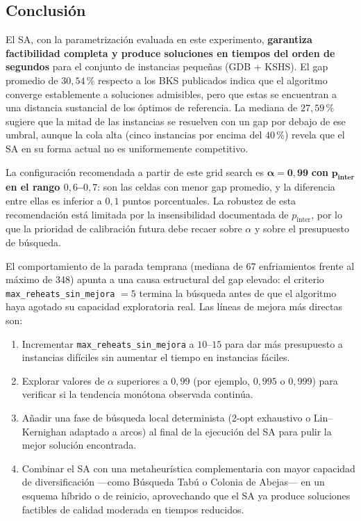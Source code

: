 \subsection{Conclusión}
\label{subsec:conclusion_final}

El SA, con la parametrización evaluada en este experimento, \textbf{garantiza
factibilidad completa y produce soluciones en tiempos del orden de segundos} para el
conjunto de instancias pequeñas (GDB + KSHS). El gap promedio de \(30{,}54\,\%\)
respecto a los BKS publicados indica que el algoritmo converge establemente a
soluciones admisibles, pero que estas se encuentran a una distancia sustancial de los
óptimos de referencia. La mediana de \(27{,}59\,\%\) sugiere que la mitad de las
instancias se resuelven con un gap por debajo de ese umbral, aunque la cola alta (cinco
instancias por encima del \(40\,\%\)) revela que el SA en su forma actual no es
uniformemente competitivo.

La configuración recomendada a partir de este grid search es \(\boldsymbol{\alpha =
0{,}99}\) \textbf{con} \(\boldsymbol{p_{\text{inter}}}\) \textbf{en el rango
\(0{,}6\)--\(0{,}7\)}: son las celdas con menor gap promedio, y la diferencia entre
ellas es inferior a \(0{,}1\) puntos porcentuales. La robustez de esta recomendación
está limitada por la insensibilidad documentada de \(p_{\text{inter}}\), por lo que la
prioridad de calibración futura debe recaer sobre \(\alpha\) y sobre el presupuesto de
búsqueda.

El comportamiento de la parada temprana (mediana de 67 enfriamientos frente al máximo
de 348) apunta a una causa estructural del gap elevado: el criterio
\texttt{max\_reheats\_sin\_mejora} \(= 5\) termina la búsqueda antes de que el
algoritmo haya agotado su capacidad exploratoria real. Las líneas de mejora más directas
son:

\begin{enumerate}
  \item Incrementar \texttt{max\_reheats\_sin\_mejora} a \(10\)--\(15\) para dar más
        presupuesto a instancias difíciles sin aumentar el tiempo en instancias fáciles.
  \item Explorar valores de \(\alpha\) superiores a \(0{,}99\) (por ejemplo, \(0{,}995\)
        o \(0{,}999\)) para verificar si la tendencia monótona observada continúa.
  \item Añadir una fase de búsqueda local determinista (2-opt exhaustivo o
        Lin--Kernighan adaptado a arcos) al final de la ejecución del SA para pulir la
        mejor solución encontrada.
  \item Combinar el SA con una metaheurística complementaria con mayor capacidad de
        diversificación ---como Búsqueda Tabú o Colonia de Abejas--- en un esquema
        híbrido o de reinicio, aprovechando que el SA ya produce soluciones factibles de
        calidad moderada en tiempos reducidos.
\end{enumerate}
